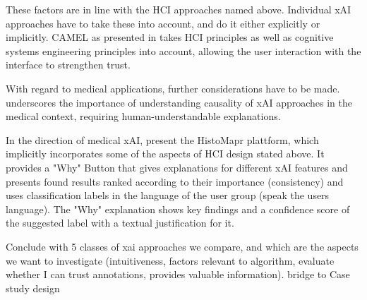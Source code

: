 These factors are in line with the HCI approaches named above. Individual xAI approaches have to take these into account, and do it either explicitly or implicitly. CAMEL as presented in \cite{gunning2019darpa} takes HCI principles as well as cognitive systems engineering principles into account, allowing the user interaction with the interface to strengthen trust. 

With regard to medical applications, further considerations have to be made. \cite{holzinger2017we} underscores the importance of understanding causality of xAI approaches in the medical context, requiring human-understandable explanations.

In the direction of medical xAI, \cite{tosun_histomapr_2020} present the HistoMapr plattform, which implicitly incorporates some of the aspects of HCI design stated above. It provides a "Why" Button that gives explanations for different xAI features and presents found results ranked according to their importance (consistency) and uses classification labels in the language of the user group (speak the users language). The "Why" explanation shows key findings and a confidence score of the suggested label with a textual justification for it. 

Conclude with 5 classes of xai approaches we compare, and which are the aspects we want to investigate (intuitiveness, factors relevant to algorithm, evaluate whether I can trust annotations, provides valuable information). bridge to Case study design



